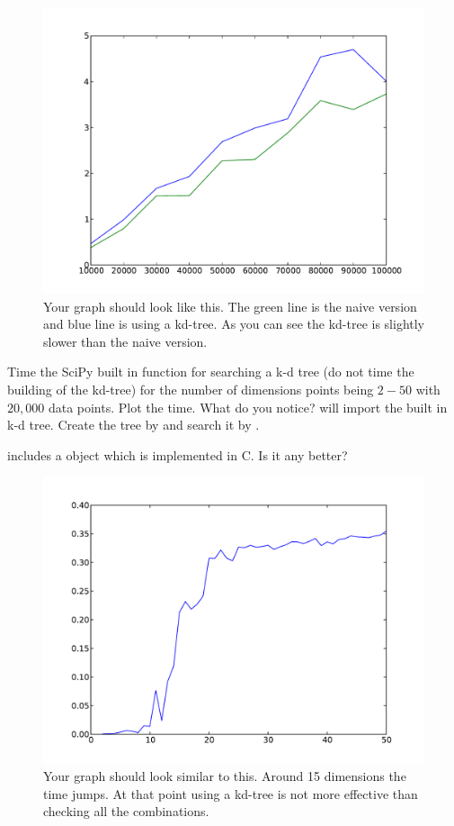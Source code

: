\begin{figure}[H]
\includegraphics[scale = .5]{20dTime.pdf}
\caption{
Your graph should look like this.
The green line is the naive version and blue line is using a kd-tree.
As you can see the kd-tree is slightly slower than the naive version.}
\end{figure}

\begin{problem}
Time the SciPy built in function for searching a k-d tree (do not time the building of the kd-tree) for the number of dimensions points being $2-50$ with $20,000$ data points.
Plot the time.
What do you notice?
 will import the built in k-d tree.
Create the tree by  and search it by .

 includes a  object which is implemented in C.
Is it any better?

\end{problem}
\begin{figure}[h!]
\includegraphics[scale = .5]{curseD.pdf}
\caption{
Your graph should look similar to this.
Around 15 dimensions the time jumps.
At that point using a kd-tree is not more effective than checking all the combinations.}
\end{figure}


